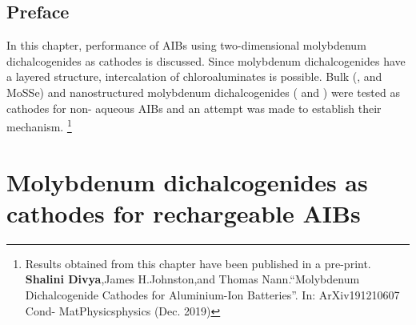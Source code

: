 \section*{Preface}
In this chapter, performance of AIBs using two-dimensional molybdenum dichalcogenides as cathodes is discussed. Since molybdenum dichalcogenides have a layered structure, intercalation of chloroaluminates is possible. Bulk (,  and MoSSe) and nanostructured molybdenum dichalcogenides ( and ) were tested as cathodes for non- aqueous AIBs and an attempt was made to establish their mechanism. \footnote{Results obtained from this chapter have been published in a pre-print. \textbf{Shalini Divya},James H.Johnston,and Thomas Nann.“Molybdenum Dichalcogenide Cathodes for Aluminium-Ion Batteries”. In: ArXiv191210607 Cond- MatPhysicsphysics (Dec. 2019)}

\pagebreak
\chapter{Molybdenum dichalcogenides as cathodes for rechargeable AIBs} %

\label{chap4} %

